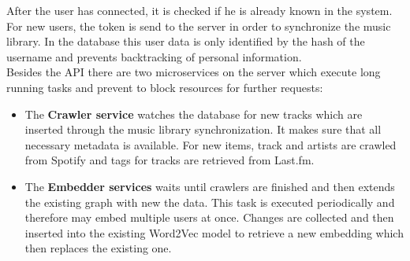 \documentclass[sigconf]{acmart}
\begin{document}
After the user has connected, it is checked if he is already known in the system. For new users, the token is send to the server in order to synchronize the music library. In the database this user data is only identified by the hash of the username and prevents backtracking of personal information.\\

Besides the API there are two microservices on the server which execute long running tasks and prevent to block resources for further requests:
\begin{itemize}
	\item The \textbf{Crawler service} watches the database for new tracks which are inserted through the music library synchronization. It makes sure that all necessary metadata is available. For new items, track and artists are crawled from Spotify and tags for tracks are retrieved from Last.fm.
	\item The \textbf{Embedder services} waits until crawlers are finished and then extends the existing graph with new the data. This task is executed periodically and therefore may embed multiple users at once. Changes are collected and then inserted into the existing Word2Vec model to retrieve a new embedding which then replaces the existing one.
\end{itemize}
\end{document}
